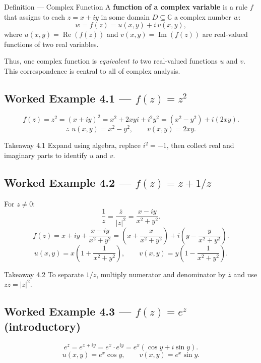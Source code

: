 \documentclass[12pt,a4paper]{article}
\begin{document}
\begin{infobox}{Definition --- Complex Function}
A \textbf{function of a complex variable} is a rule \(f\) that assigns to
each \(z = x+iy\) in some domain \(D \subseteq \mathbb{C}\) a complex
number \(w\):
\[
  w = f(z) = u(x,y) + i\,v(x,y),
\]
where \(u(x,y) = \operatorname{Re}(f(z))\) and
\(v(x,y) = \operatorname{Im}(f(z))\) are real-valued functions of two real
variables.
\end{infobox}

Thus, one complex function is \emph{equivalent to} two real-valued functions
\(u\) and \(v\).  This correspondence is central to all of complex analysis.

\subsection*{Worked Example 4.1 --- \(f(z) = z^2\)}

\[
  f(z) = z^2 = (x+iy)^2 = x^2 + 2xyi + i^2 y^2 = (x^2-y^2)+i(2xy).
\]
\[
  \therefore\; u(x,y) = x^2 - y^2, \qquad v(x,y) = 2xy.
\]

\begin{learnbox}{Takeaway 4.1}
Expand using algebra, replace \(i^2=-1\), then collect real and imaginary
parts to identify \(u\) and \(v\).
\end{learnbox}

\subsection*{Worked Example 4.2 --- \(f(z) = z + 1/z\)}

For \(z \neq 0\):
\[
  \frac{1}{z} = \frac{\overline{z}}{|z|^2} = \frac{x-iy}{x^2+y^2}.
\]
\[
  f(z) = x+iy + \frac{x-iy}{x^2+y^2}
       = \left(x + \frac{x}{x^2+y^2}\right)
         + i\left(y - \frac{y}{x^2+y^2}\right).
\]
\[
  u(x,y) = x\!\left(1+\frac{1}{x^2+y^2}\right), \qquad
  v(x,y) = y\!\left(1-\frac{1}{x^2+y^2}\right).
\]

\begin{learnbox}{Takeaway 4.2}
To separate \(1/z\), multiply numerator and denominator by \(\overline{z}\)
and use \(z\overline{z}=|z|^2\).
\end{learnbox}

\subsection*{Worked Example 4.3 --- \(f(z) = e^z\) (introductory)}

\[
  e^z = e^{x+iy} = e^x \cdot e^{iy} = e^x(\cos y + i\sin y).
\]
\[
  u(x,y) = e^x \cos y, \qquad v(x,y) = e^x \sin y.
\]
\end{document}

